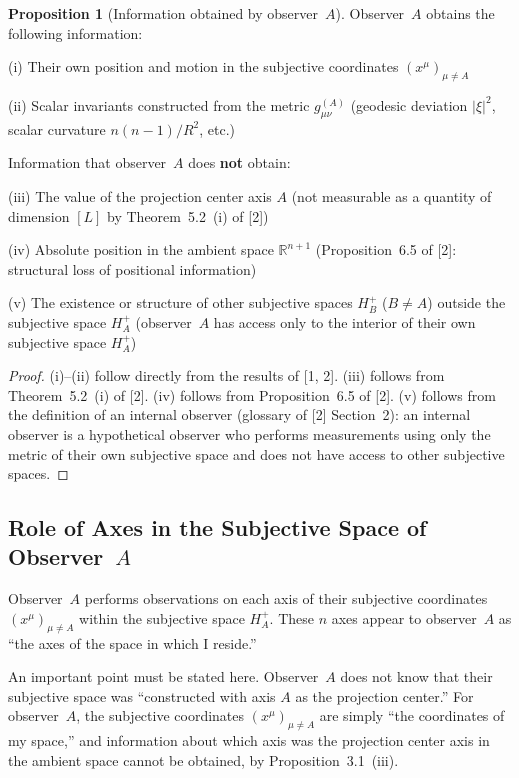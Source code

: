 \documentclass[a4paper,11pt]{article}
\theoremstyle{definition}
\newtheorem{proposition}[theorem]{Proposition}
\begin{document}
\begin{proposition}[Information obtained by observer~\(A\)]
Observer~\(A\) obtains the following information:

\textup{(i)} Their own position and motion in the subjective coordinates \((x^\mu)_{\mu \neq A}\)

\textup{(ii)} Scalar invariants constructed from the metric \(g_{\mu\nu}^{(A)}\) (geodesic deviation \(|\xi|^2\), scalar curvature \(n(n-1)/R^2\), etc.)

\medskip
Information that observer~\(A\) does \textbf{not} obtain:

\textup{(iii)} The value of the projection center axis \(A\) (not measurable as a quantity of dimension \([L]\) by Theorem~5.2~(i) of {[2]})

\textup{(iv)} Absolute position in the ambient space \(\mathbb{R}^{n+1}\) (Proposition~6.5 of {[2]}: structural loss of positional information)

\textup{(v)} The existence or structure of other subjective spaces \(H_B^+\) (\(B \neq A\)) outside the subjective space \(H_A^+\) (observer~\(A\) has access only to the interior of their own subjective space \(H_A^+\))
\end{proposition}

\begin{proof}
(i)--(ii) follow directly from the results of {[1, 2]}. (iii) follows from Theorem~5.2~(i) of {[2]}. (iv) follows from Proposition~6.5 of {[2]}. (v) follows from the definition of an internal observer (glossary of {[2]} Section~2): an internal observer is a hypothetical observer who performs measurements using only the metric of their own subjective space and does not have access to other subjective spaces.
\end{proof}

\subsection{Role of Axes in the Subjective Space of Observer~\(A\)}

Observer~\(A\) performs observations on each axis of their subjective coordinates \((x^\mu)_{\mu \neq A}\) within the subjective space \(H_A^+\). These \(n\) axes appear to observer~\(A\) as ``the axes of the space in which I reside.''

An important point must be stated here. Observer~\(A\) does not know that their subjective space was ``constructed with axis \(A\) as the projection center.'' For observer~\(A\), the subjective coordinates \((x^\mu)_{\mu \neq A}\) are simply ``the coordinates of my space,'' and information about which axis was the projection center axis in the ambient space cannot be obtained, by Proposition~3.1~(iii).
\end{document}

